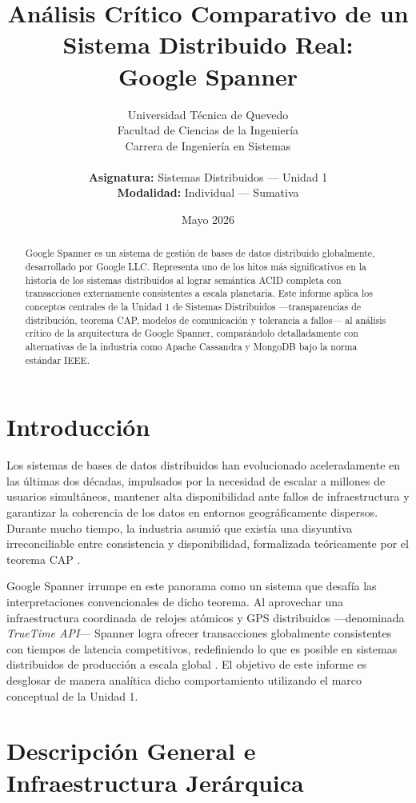 \documentclass[11pt,a4paper]{article}
\title{\textbf{Análisis Crítico Comparativo de un Sistema Distribuido Real:} \\
Google Spanner}
\author{
    Universidad Técnica de Quevedo \\
    Facultad de Ciencias de la Ingeniería \\
    Carrera de Ingeniería en Sistemas \\
    \vspace{0.5cm} \\
    \textbf{Asignatura:} Sistemas Distribuidos --- Unidad 1 \\
    \textbf{Modalidad:} Individual — Sumativa
}
\date{Mayo 2026}
\begin{document}
\maketitle

\begin{abstract}
Google Spanner es un sistema de gestión de bases de datos distribuido globalmente, desarrollado por Google LLC. Representa uno de los hitos más significativos en la historia de los sistemas distribuidos al lograr semántica ACID completa con transacciones externamente consistentes a escala planetaria. Este informe aplica los conceptos centrales de la Unidad 1 de Sistemas Distribuidos ---transparencias de distribución, teorema CAP, modelos de comunicación y tolerancia a fallos--- al análisis crítico de la arquitectura de Google Spanner, comparándolo detalladamente con alternativas de la industria como Apache Cassandra y MongoDB bajo la norma estándar IEEE.
\end{abstract}

\tableofcontents
\newpage

\section{Introducción}
Los sistemas de bases de datos distribuidos han evolucionado aceleradamente en las últimas dos décadas, impulsados por la necesidad de escalar a millones de usuarios simultáneos, mantener alta disponibilidad ante fallos de infraestructura y garantizar la coherencia de los datos en entornos geográficamente dispersos. Durante mucho tiempo, la industria asumió que existía una disyuntiva irreconciliable entre consistencia y disponibilidad, formalizada teóricamente por el teorema CAP \cite{brewer2012}.

Google Spanner irrumpe en este panorama como un sistema que desafía las interpretaciones convencionales de dicho teorema. Al aprovechar una infraestructura coordinada de relojes atómicos y GPS distribuidos ---denominada \textit{TrueTime API}--- Spanner logra ofrecer transacciones globalmente consistentes con tiempos de latencia competitivos, redefiniendo lo que es posible en sistemas distribuidos de producción a escala global \cite{corbett2012}. El objetivo de este informe es desglosar de manera analítica dicho comportamiento utilizando el marco conceptual de la Unidad 1.

\section{Descripción General e Infraestructura Jerárquica}
\end{document}
